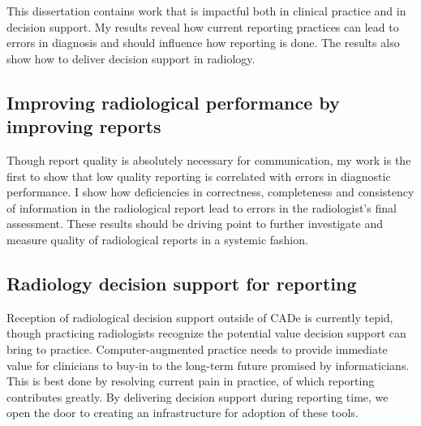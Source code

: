 This dissertation contains work that is impactful both in clinical practice and in decision support. My results reveal how current reporting practices can lead to errors in diagnosis and should influence how reporting is done. The results also show how to deliver decision support in radiology.

\subsection{Improving radiological performance by improving reports}
Though report quality is absolutely necessary for communication, my work is the first to show that low quality reporting is correlated with errors in diagnostic performance. I show how deficiencies in correctness, completeness and consistency of information in the radiological report lead to errors in the radiologist's final assessment. These results should be driving point to further investigate and measure quality of radiological reports in a systemic fashion. 

\subsection{Radiology decision support for reporting}
Reception of radiological decision support outside of CADe is currently tepid, though practicing radiologists recognize the potential value decision support can bring to practice. Computer-augmented practice needs to provide immediate value for clinicians to buy-in to the long-term future promised by informaticians. This is best done by resolving current pain in practice, of which reporting contributes greatly. By delivering decision support during reporting time, we open the door to creating an infrastructure for adoption of these tools.
